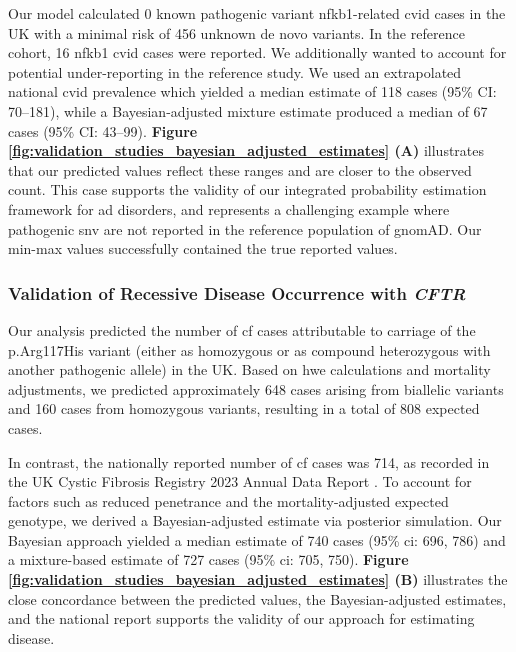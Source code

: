 Our model calculated 0 known pathogenic variant \ac{nfkb1}-related \ac{cvid} cases in the UK with a minimal risk of 456 unknown de novo variants. In the reference cohort, 16 \ac{nfkb1} \ac{cvid} cases were reported. We additionally wanted to account for potential under-reporting in the reference study. We used an extrapolated national \ac{cvid} prevalence which yielded a median estimate of 118 cases (95\% CI: 70–181), while a Bayesian-adjusted mixture estimate produced a median of 67 cases (95\% CI: 43–99). \textbf{Figure \ref{fig:validation_studies_bayesian_adjusted_estimates} (A)} illustrates that our predicted values reflect these ranges and are closer to the observed count. This case supports the validity of our integrated probability estimation framework for \ac{ad} disorders, and represents a challenging example where pathogenic \ac{snv} are not reported in the reference population of gnomAD. Our min-max values successfully contained the true reported values.


\subsubsection{Validation of Recessive Disease Occurrence with \textit{CFTR}}

Our analysis predicted the number of \ac{cf} cases attributable to carriage of the p.Arg117His variant (either as homozygous or as compound heterozygous with another pathogenic allele) in the UK. Based on \ac{hwe} calculations and mortality adjustments, we predicted approximately 648 cases arising from biallelic variants and 160 cases from homozygous variants, resulting in a total of 808 expected cases.

In contrast, the nationally reported number of \ac{cf} cases was 714, as recorded in the UK Cystic Fibrosis Registry 2023 Annual Data Report
\cite{naito2023uk}. To account for factors such as reduced penetrance and the mortality-adjusted expected genotype, we derived a Bayesian-adjusted estimate via posterior simulation. Our Bayesian approach yielded a median estimate of 740 cases (95\% \ac{ci}: 696, 786) and a mixture-based estimate of 727 cases (95\% \ac{ci}: 705, 750).
\textbf{Figure \ref{fig:validation_studies_bayesian_adjusted_estimates} (B)} illustrates the close concordance between the predicted values, the Bayesian-adjusted estimates, and the national report supports the validity of our approach for estimating disease.


